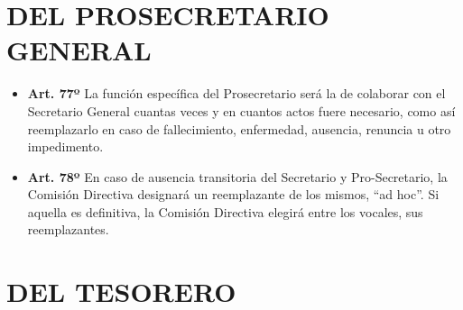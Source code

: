 \documentclass[]{book}
\begin{document}
\chapter{DEL PROSECRETARIO GENERAL}\label{del-prosecretario-general}

\begin{itemize}
\item
  \textbf{Art. 77º} La función específica del Prosecretario será la de
  colaborar con el Secretario General cuantas veces y en cuantos actos
  fuere necesario, como así reemplazarlo en caso de fallecimiento,
  enfermedad, ausencia, renuncia u otro impedimento.
\item
  \textbf{Art. 78º} En caso de ausencia transitoria del Secretario y
  Pro-Secretario, la Comisión Directiva designará un reemplazante de los
  mismos, ``ad hoc''. Si aquella es definitiva, la Comisión Directiva
  elegirá entre los vocales, sus reemplazantes.
\end{itemize}

\chapter{DEL TESORERO}\label{del-tesorero}
\end{document}
